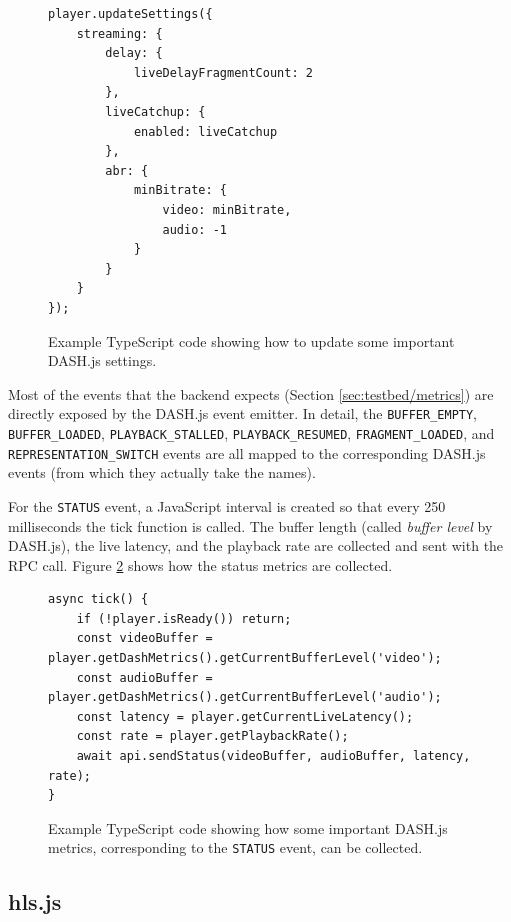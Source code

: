 \begin{figure}[h]
    \centering
    \begin{verbatim}
player.updateSettings({
    streaming: {
        delay: {
            liveDelayFragmentCount: 2
        },
        liveCatchup: {
            enabled: liveCatchup
        },
        abr: {
            minBitrate: {
                video: minBitrate,
                audio: -1
            }
        }
    }
});
    \end{verbatim}
    \caption{Example TypeScript code showing how to update some important DASH.js settings.}
    \label{fig:dashjs_settings}
\end{figure}

Most of the events that the backend expects (Section \ref{sec:testbed/metrics}) are directly exposed by the DASH.js event emitter. In detail, the \texttt{BUFFER\_EMPTY}, \texttt{BUFFER\_LOADED}, \texttt{PLAYBACK\_STALLED}, \texttt{PLAYBACK\_RESUMED}, \texttt{FRAGMENT\_LOADED}, and \texttt{REPRESENTATION\_SWITCH} events are all mapped to the corresponding DASH.js events (from which they actually take the names).

For the \texttt{STATUS} event, a JavaScript interval is created so that every 250 milliseconds the tick function is called. The buffer length (called \textit{buffer level} by DASH.js), the live latency, and the playback rate are collected and sent with the RPC call. Figure \ref{fig:dashjs_tick} shows how the status metrics are collected.

\begin{figure}[h]
    \centering
    \begin{verbatim}
async tick() {
    if (!player.isReady()) return;
    const videoBuffer = player.getDashMetrics().getCurrentBufferLevel('video');
    const audioBuffer = player.getDashMetrics().getCurrentBufferLevel('audio');
    const latency = player.getCurrentLiveLatency();
    const rate = player.getPlaybackRate();
    await api.sendStatus(videoBuffer, audioBuffer, latency, rate);
}
    \end{verbatim}
    \caption{Example TypeScript code showing how some important DASH.js metrics, corresponding to the \texttt{STATUS} event, can be collected.}
    \label{fig:dashjs_tick}
\end{figure}

\subsection{hls.js}
\label{sec:testbed/frontend/hlsjs}

